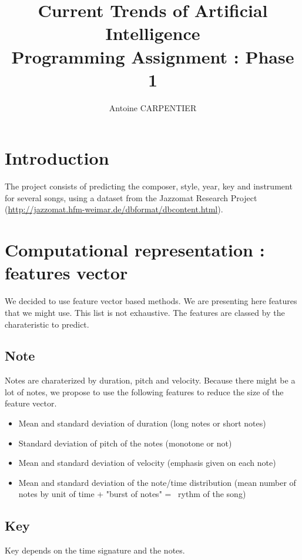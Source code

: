 \documentclass[a4paper,12pt]{article}
\author{Antoine CARPENTIER}
\title{Current Trends of Artificial Intelligence\\ \small Programming Assignment : Phase 1}
\begin{document}
\maketitle

\section{Introduction}

The project consists of predicting the composer, style, year, key and instrument for several songs, using a dataset from the Jazzomat Research Project (\url{http://jazzomat.hfm-weimar.de/dbformat/dbcontent.html}).

\section{Computational representation : features vector}

We decided to use feature vector based methods. We are presenting here features that we might use. This list is not exhaustive. The features are classed by the charateristic to predict.

\subsection{Note}

Notes are charaterized by duration, pitch and velocity. Because there might be a lot of notes, we propose to use the following features to reduce the size of the feature vector.

\begin{itemize}
    \item Mean and standard deviation of duration (long notes or short notes)
    \item Standard deviation of pitch of the notes (monotone or not)
    \item Mean and standard deviation of velocity (emphasis given on each note)
    \item Mean and standard deviation of the note/time distribution (mean number of notes by unit of time + "burst of notes" =~ rythm of the song) 
\end{itemize}

\subsection{Key}

Key depends on the time signature and the notes. 
\end{document}
